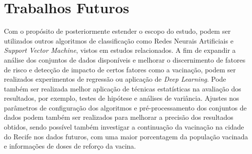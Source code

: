\section{Trabalhos Futuros}
\label{sec:trabalhosfuturos}

Com o propósito de posteriormente estender o escopo do estudo, podem ser utilizados outros algoritmos de classificação como Redes Neurais Artificiais e \textit{Support Vector Machine}, vistos em estudos relacionados. A fim de expandir a análise dos conjuntos de dados disponíveis e melhorar o discernimento de fatores de risco e detecção de impacto de certos fatores como a vacinação, podem ser realizados experimentos de regressão ou aplicação de \textit{Deep Learning}. Pode também ser realizada melhor aplicação de técnicas estatísticas na avaliação dos resultados, por exemplo, testes de hipótese e análises de variância. Ajustes nos parâmetros de configuração dos algoritmos e pré-processamento dos conjuntos de dados podem também ser realizados para melhorar a precisão dos resultados obtidos, sendo possível também investigar a continuação da vacinação na cidade do Recife nos dados futuros, com uma maior porcentagem da população vacinada e informações de doses de reforço da vacina. 